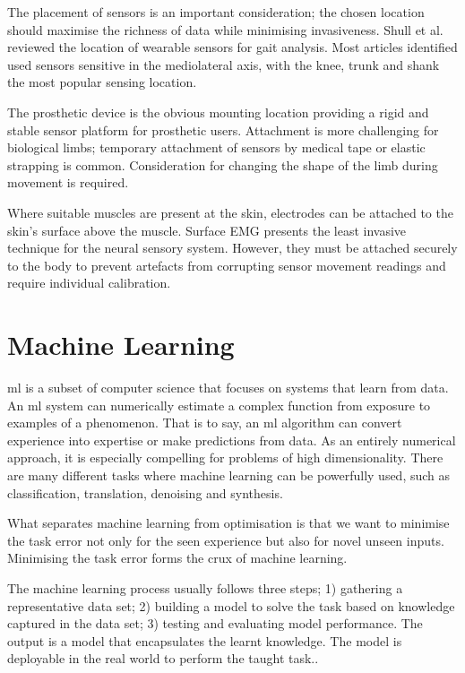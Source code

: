 The placement of sensors is an important consideration; the chosen location should maximise the richness of data while minimising invasiveness\cite{Tucker2015}. Shull et al. reviewed the location of wearable sensors for gait analysis. Most articles identified used sensors sensitive in the mediolateral axis, with the knee, trunk and shank the most popular sensing location.\cite{Shull2014}

The prosthetic device is the obvious mounting location providing a rigid and stable sensor platform for prosthetic users. Attachment is more challenging for biological limbs; temporary attachment of sensors by medical tape or elastic strapping is common. Consideration for changing the shape of the limb during movement is required.

Where suitable muscles are present at the skin, electrodes can be attached to the skin's surface above the muscle. Surface EMG presents the least invasive technique for the neural sensory system. However, they must be attached securely to the body to prevent artefacts from corrupting sensor movement readings and require individual calibration.


\section{Machine Learning}
\label{sec:background-machine-learning}
\acrfull{ml} is a subset of computer science that focuses on systems that learn from data. An \acrshort{ml} system can numerically estimate a complex function from exposure to examples of a phenomenon. That is to say, an \acrshort{ml} algorithm can convert experience into expertise or make predictions from data. As an entirely numerical approach, it is especially compelling for problems of high dimensionality. There are many different tasks where machine learning can be powerfully used, such as classification, translation, denoising and synthesis.\cite{Mitchell1997, Shalev-Shwartz2014, Goodfellow2015, Burkov2019}

What separates machine learning from optimisation is that we want to minimise the task error not only for the seen experience but also for novel unseen inputs. Minimising the task error forms the crux of machine learning.\cite{Goodfellow2015}

The machine learning process usually follows three steps; 1) gathering a representative data set; 2) building a model to solve the task based on knowledge captured in the data set; 3) testing and evaluating model performance\cite{Burkov2019}. The output is a model that encapsulates the learnt knowledge. The model is deployable in the real world to perform the taught task.\cite{Shalev-Shwartz2014}.

